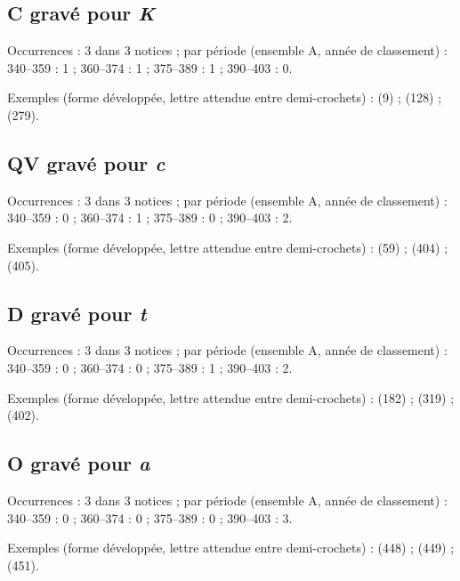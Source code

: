 \subsection*{C gravé pour \textit{K}}
\noindent Occurrences : 3 dans 3 notices ; par période (ensemble A, année de classement) : 340–359 : 1 ; 360–374 : 1 ; 375–389 : 1 ; 390–403 : 0.\par
\noindent Exemples (forme développée, lettre attendue entre demi-crochets) :  (9) ;  (128) ;  (279).\par
{}\par\medskip
\subsection*{QV gravé pour \textit{c}}
\noindent Occurrences : 3 dans 3 notices ; par période (ensemble A, année de classement) : 340–359 : 0 ; 360–374 : 1 ; 375–389 : 0 ; 390–403 : 2.\par
\noindent Exemples (forme développée, lettre attendue entre demi-crochets) :  (59) ;  (404) ;  (405).\par
{}\par\medskip
\subsection*{D gravé pour \textit{t}}
\noindent Occurrences : 3 dans 3 notices ; par période (ensemble A, année de classement) : 340–359 : 0 ; 360–374 : 0 ; 375–389 : 1 ; 390–403 : 2.\par
\noindent Exemples (forme développée, lettre attendue entre demi-crochets) :  (182) ;  (319) ;  (402).\par
{}\par\medskip
\subsection*{O gravé pour \textit{a}}
\noindent Occurrences : 3 dans 3 notices ; par période (ensemble A, année de classement) : 340–359 : 0 ; 360–374 : 0 ; 375–389 : 0 ; 390–403 : 3.\par
\noindent Exemples (forme développée, lettre attendue entre demi-crochets) :  (448) ;  (449) ;  (451).\par
{}\par\medskip
